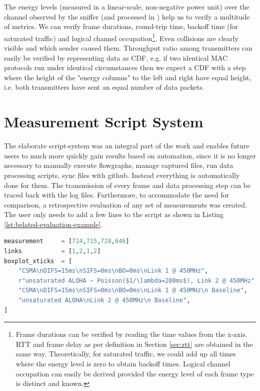 The energy levels (measured in a linear-scale, non-negative power unit) over the channel observed by the sniffer (and processed in ) help us to verify a multitude of metrics. We can verify frame durations, round-trip time, backoff time (for saturated traffic) and logical channel occupation\footnote{Frame durations can be verified by reading the time values from the x-axis. RTT and frame delay as per definition in Section \ref{sec:rtt} are obtained in the same way. Theoretically, for saturated traffic, we could add up all times where the energy level is zero to obtain backoff times. Logical channel occupation can easily be derived provided the energy level of each frame type is distinct and known.}. Even collisions are clearly visible and which sender caused them. Throughput ratio among transmitters can easily be verified by representing data as CDF, e.g. if two identical MAC protocols run under identical circumstances then we expect a CDF with a step where the height of the "energy columns" to the left and right have equal height, i.e. both transmitters have sent an equal number of data packets.

\section{Measurement Script System}
\label{sec:script-system}

The elaborate script-system was an integral part of the work and enables future users to much more quickly gain results based on automation, since it is no longer necessary to manually execute flowgraphs, manage captured files, run data processing scripts, sync files with github. Instead everything is automatically done for them. The transmission of every frame and data processing step can be traced back with the log files. Furthermore, to accommodate the need for comparison, a retrospective evaluation of any set of measurements  was created. The user only needs to add a few lines to the script as shown in Listing \ref{lst:belated-evaluation-example}.
  
\begin{lstlisting}[language=Python,caption=Evaluation of measurements with \code{belated\_evaluation.py}. In \code{links} we denote the link we used in the corresponding measurement (compare Figure \ref{fig:measurement-setup}).,label=lst:belated-evaluation-example]
measurement     = [714,715,728,646]
links           = [1,2,1,2]
boxplot_xticks  = [
	"CSMA\nDIFS=15ms\nSIFS=0ms\nBO=0ms\nLink 1 @ 450MHz",
    r"unsaturated ALOHA ~ Poisson($1/\lambda=200ms$), Link 2 @ 450MHz",
    "CSMA\nDIFS=15ms\nSIFS=0ms\nBO=0ms\nLink 1 @ 450MHz\n Baseline",
    "unsaturated ALOHA\nLink 2 @ 450MHz\n Baseline",
]
\end{lstlisting}

